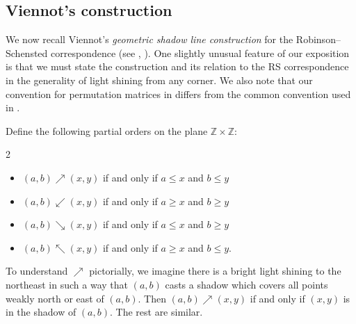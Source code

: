 \documentclass{amsart}
\theoremstyle{definition}
\begin{document}
%    
%    
%    

\subsection{Viennot's construction}\label{sec:background-Viennot}
We now recall Viennot's \emph{geometric shadow line construction} for the Robinson--Schensted correspondence (see \cite{Viennot-geometric}, \cite[\S3.6]{Sagan-symmetric-group}). One slightly unusual feature of our exposition is that we must state the construction and its relation to the RS correspondence in the generality of light shining from any corner. We also note that our convention for permutation matrices in  differs from the common convention used in \cite[\S3.6]{Sagan-symmetric-group}.

Define the following partial orders on the plane $\mathbb{Z} \times \mathbb{Z}$:
\begin{multicols}{2}
\begin{itemize}
    \item $(a, b) \nearrow (x, y)$ if and only if $a \leq x$ and $b \leq y$
    \item $(a, b) \swarrow (x, y)$ if and only if $a \geq x$ and $b \geq y$
    \item $(a, b) \searrow (x, y)$ if and only if $a \leq x$ and $b \geq y$
    \item $(a, b) \nwarrow (x, y)$ if and only if $a \geq x$ and $b \leq y$.
\end{itemize}
\end{multicols}
\noindent To understand $\nearrow$ pictorially, we imagine there is a bright light shining to the northeast in such a way that $(a, b)$ casts a shadow which covers all points weakly north or east of $(a, b)$. Then $(a, b) \nearrow (x, y)$ if and only if $(x, y)$ is in the shadow of $(a, b)$. The rest are similar.
\end{document}
